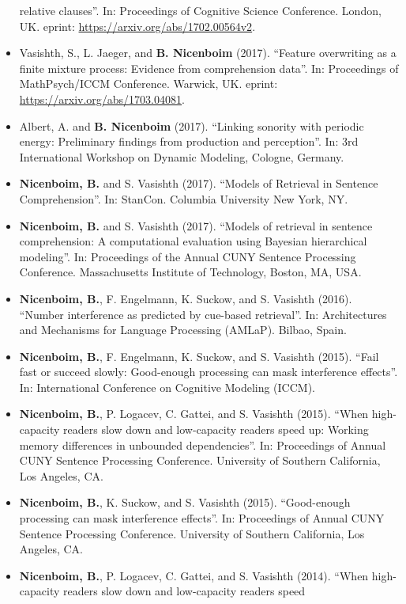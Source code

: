 \documentclass[]{article}
\begin{document}
\begin{itemize}
  relative clauses''. In: Proceedings of Cognitive Science Conference.
  London, UK. eprint: \url{https://arxiv.org/abs/1702.00564v2}.
\item
  Vasishth, S., L. Jaeger, and \textbf{B. Nicenboim} (2017). ``Feature
  overwriting as a finite mixture process: Evidence from comprehension
  data''. In: Proceedings of MathPsych/ICCM Conference. Warwick, UK.
  eprint: \url{https://arxiv.org/abs/1703.04081}.
\item
  Albert, A. and \textbf{B. Nicenboim} (2017). ``Linking sonority with
  periodic energy: Preliminary findings from production and
  perception''. In: 3rd International Workshop on Dynamic Modeling,
  Cologne, Germany.
\item
  \textbf{Nicenboim, B.} and S. Vasishth (2017). ``Models of Retrieval
  in Sentence Comprehension''. In: StanCon. Columbia University New
  York, NY.
\item
  \textbf{Nicenboim, B.} and S. Vasishth (2017). ``Models of retrieval
  in sentence comprehension: A computational evaluation using Bayesian
  hierarchical modeling''. In: Proceedings of the Annual CUNY Sentence
  Processing Conference. Massachusetts Institute of Technology, Boston,
  MA, USA.
\item
  \textbf{Nicenboim, B.}, F. Engelmann, K. Suckow, and S. Vasishth
  (2016). ``Number interference as predicted by cue-based retrieval''.
  In: Architectures and Mechanisms for Language Processing (AMLaP).
  Bilbao, Spain.
\item
  \textbf{Nicenboim, B.}, F. Engelmann, K. Suckow, and S. Vasishth
  (2015). ``Fail fast or succeed slowly: Good-enough processing can mask
  interference effects''. In: International Conference on Cognitive
  Modeling (ICCM).
\item
  \textbf{Nicenboim, B.}, P. Logacev, C. Gattei, and S. Vasishth (2015).
  ``When high-capacity readers slow down and low-capacity readers speed
  up: Working memory differences in unbounded dependencies''. In:
  Proceedings of Annual CUNY Sentence Processing Conference. University
  of Southern California, Los Angeles, CA.
\item
  \textbf{Nicenboim, B.}, K. Suckow, and S. Vasishth (2015).
  ``Good-enough processing can mask interference effects''. In:
  Proceedings of Annual CUNY Sentence Processing Conference. University
  of Southern California, Los Angeles, CA.
\item
  \textbf{Nicenboim, B.}, P. Logacev, C. Gattei, and S. Vasishth (2014).
  ``When high-capacity readers slow down and low-capacity readers speed

\end{itemize}
\end{document}
